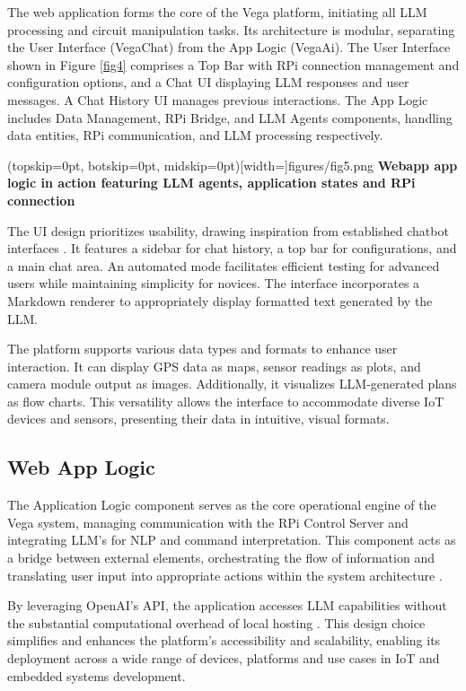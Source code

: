 \documentclass{ieeeaccess}
\begin{document}
The web application forms the core of the Vega platform, initiating all LLM processing and circuit manipulation tasks. Its architecture is modular, separating the User Interface (VegaChat) from the App Logic (VegaAi). The User Interface shown in Figure \ref{fig4} comprises a Top Bar with RPi connection management and configuration options, and a Chat UI displaying LLM responses and user messages. A Chat History UI manages previous interactions. The App Logic includes Data Management, RPi Bridge, and LLM Agents components, handling data entities, RPi communication, and LLM processing respectively.

\Figure[t!](topskip=0pt, botskip=0pt,
midskip=0pt)[width=\textwidth]{{figures/fig5.png}}
{ \centering \textbf{Webapp app logic in action featuring LLM agents, application states and RPi connection}\label{fig5}}

The UI design prioritizes usability, drawing inspiration from established chatbot interfaces \cite{OpenAI_GPT}. It features a sidebar for chat history, a top bar for configurations, and a main chat area. An automated mode facilitates efficient testing for advanced users while maintaining simplicity for novices. The interface incorporates a Markdown renderer to appropriately display formatted text generated by the LLM.

The platform supports various data types and formats to enhance user interaction. It can display GPS data as maps, sensor readings as plots, and camera module output as images. Additionally, it visualizes LLM-generated plans as flow charts. This versatility allows the interface to accommodate diverse IoT devices and sensors, presenting their data in intuitive, visual formats.

\subsection{Web App Logic}
The Application Logic component serves as the core operational engine of the Vega system, managing communication with the RPi Control Server and integrating LLM's for NLP and command interpretation. This component acts as a bridge between external elements, orchestrating the flow of information and translating user input into appropriate actions within the system architecture \cite{taylor2010software}.

By leveraging OpenAI's API, the application accesses LLM capabilities without the substantial computational overhead of local hosting \cite{kim2024llmemestimatinggpumemory}. This design choice simplifies and enhances the platform's accessibility and scalability, enabling its deployment across a wide range of devices, platforms and use cases in IoT and embedded systems development.
\end{document}
